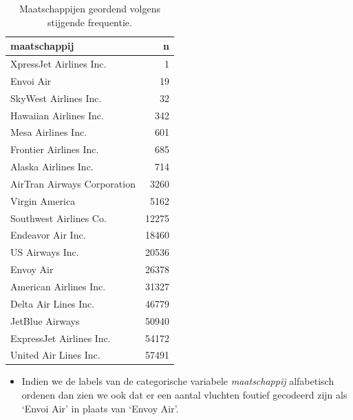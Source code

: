 \documentclass[]{tufte-book}
\newenvironment{Shaded}{}{}
\newcommand{\KeywordTok}[1]{\textcolor[rgb]{0.00,0.44,0.13}{\textbf{#1}}}
\newcommand{\NormalTok}[1]{#1}
\newcommand{\OperatorTok}[1]{\textcolor[rgb]{0.40,0.40,0.40}{#1}}
\newcommand{\StringTok}[1]{\textcolor[rgb]{0.25,0.44,0.63}{#1}}
\providecommand{\tightlist}{%
  \setlength{\itemsep}{0pt}\setlength{\parskip}{0pt}}
\begin{document}
\begin{Shaded}
\end{Shaded}

\begin{table}

\caption{\label{tab:5-5b}Maatschappijen geordend volgens stijgende frequentie.}
\centering
\fontsize{10}{12}\selectfont
\begin{tabular}[t]{lr}
\toprule
maatschappij & n\\
\midrule
XpressJet Airlines Inc. & 1\\
Envoi Air & 19\\
SkyWest Airlines Inc. & 32\\
Hawaiian Airlines Inc. & 342\\
Mesa Airlines Inc. & 601\\
\addlinespace
Frontier Airlines Inc. & 685\\
Alaska Airlines Inc. & 714\\
AirTran Airways Corporation & 3260\\
Virgin America & 5162\\
Southwest Airlines Co. & 12275\\
\addlinespace
Endeavor Air Inc. & 18460\\
US Airways Inc. & 20536\\
Envoy Air & 26378\\
American Airlines Inc. & 31327\\
Delta Air Lines Inc. & 46779\\
\addlinespace
JetBlue Airways & 50940\\
ExpressJet Airlines Inc. & 54172\\
United Air Lines Inc. & 57491\\
\bottomrule
\end{tabular}
\end{table}

\begin{itemize}
\tightlist
\item
  Indien we de labels van de categorische variabele \emph{maatschappij} alfabetisch ordenen dan zien we ook dat er een aantal vluchten foutief gecodeerd zijn als `Envoi Air' in plaats van `Envoy Air'.
\end{itemize}
\end{document}
